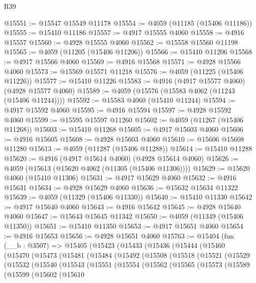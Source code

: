 \begin{lexlean}{R39}
\begin{coremodule}
@15551 := @15547 @15549 @11178
@15554 := @4059 (@11185 (@15406 @11186))
@15555 := @15410 @11186
@15557 := @4917 @15555 @4060
@15558 := @4916 @15557
@15560 := @4928 @15555 @4060
@15562 := @15558 @15560 @11198
@15565 := @4059 (@11205 (@15406 @11206))
@15566 := @15410 @11206
@15568 := @4917 @15566 @4060
@15569 := @4916 @15568
@15571 := @4928 @15566 @4060
@15573 := @15569 @15571 @11218
@15576 := @4059 (@11225 (@15406 @11226))
@15577 := @15410 @11226
@15583 := @4916 (@4917 @15577 @4060) (@4928 @15577 @4060)
@15589 := @4059 (@15576 (@15583 @4062 (@11243 (@15406 @11244))))
@15592 := @15583 @4060 (@15410 @11244)
@15594 := @4917 @15592 @4060
@15595 := @4916 @15594
@15597 := @4928 @15592 @4060
@15599 := @15595 @15597 @11260
@15602 := @4059 (@11267 (@15406 @11268))
@15603 := @15410 @11268
@15605 := @4917 @15603 @4060
@15606 := @4916 @15605
@15608 := @4928 @15603 @4060
@15610 := @15606 @15608 @11280
@15613 := @4059 (@11287 (@15406 @11288))
@15614 := @15410 @11288
@15620 := @4916 (@4917 @15614 @4060) (@4928 @15614 @4060)
@15626 := @4059 (@15613 (@15620 @4062 (@11305 (@15406 @11306))))
@15629 := @15620 @4060 (@15410 @11306)
@15631 := @4917 @15629 @4060
@15632 := @4916 @15631
@15634 := @4928 @15629 @4060
@15636 := @15632 @15634 @11322
@15639 := @4059 (@11329 (@15406 @11330))
@15640 := @15410 @11330
@15642 := @4917 @15640 @4060
@15643 := @4916 @15642
@15645 := @4928 @15640 @4060
@15647 := @15643 @15645 @11342
@15650 := @4059 (@11349 (@15406 @11350))
@15651 := @15410 @11350
@15653 := @4917 @15651 @4060
@15654 := @4916 @15653
@15656 := @4928 @15651 @4060
@15763 := @15404
    (fun (__b : @3507) =>
    @15405
      (@15423
        (@15433
          (@15436
            (@15444
              (@15460
                (@15470
                  (@15473
                    (@15481
                      (@15484
                        (@15492
                          (@15508
                            (@15518
                              (@15521
                                (@15529
                                  (@15532
                                    (@15540
                                      (@15543
                                        (@15551
                                          (@15554
                                            (@15562
                                              (@15565
                                                (@15573
                                                  (@15589
                                                    (@15599
                                                      (@15602
                                                        (@15610

\end{coremodule}
\end{lexlean}
